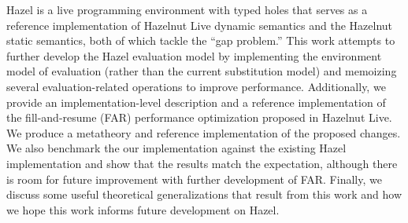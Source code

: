 
\noindent{}Hazel is a live programming environment with typed holes that serves as a reference implementation of Hazelnut Live dynamic semantics and the Hazelnut static semantics, both of which tackle the ``gap problem.'' This work attempts to further develop the Hazel evaluation model by implementing the environment model of evaluation (rather than the current substitution model) and memoizing several evaluation-related operations to improve performance. Additionally, we provide an implementation-level description and a reference implementation of the fill-and-resume (FAR) performance optimization proposed in Hazelnut Live. We produce a metatheory and reference implementation of the proposed changes. We also benchmark the our implementation against the existing Hazel implementation and show that the results match the expectation, although there is room for future improvement with further development of FAR. Finally, we discuss some useful theoretical generalizations that result from this work and how we hope this work informs future development on Hazel.

